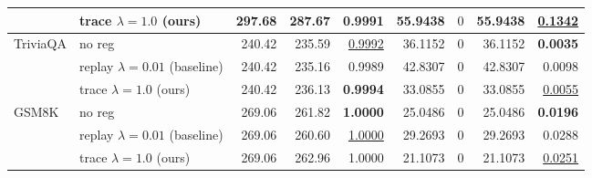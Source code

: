 \begin{table}[t]
{\begin{tabular}{l l rrrrrrr}
 & trace $\lambda{=}1.0$ (ours) & 297.68 & 287.67 & \textbf{0.9991} & 55.9438 & \cellcolor{cyan!12} $0$ & 55.9438 & \underline{0.1342} \\
\midrule
TriviaQA & no reg & 240.42 & 235.59 & \underline{0.9992} & 36.1152 & \cellcolor{cyan!12} $0$ & 36.1152 & \textbf{0.0035} \\
 & replay $\lambda{=}0.01$ (baseline) & 240.42 & 235.16 & 0.9989 & 42.8307 & \cellcolor{cyan!12} $0$ & 42.8307 & 0.0098 \\
 & trace $\lambda{=}1.0$ (ours) & 240.42 & 236.13 & \textbf{0.9994} & 33.0855 & \cellcolor{cyan!12} $0$ & 33.0855 & \underline{0.0055} \\
\midrule
GSM8K & no reg & 269.06 & 261.82 & \textbf{1.0000} & 25.0486 & \cellcolor{cyan!12} $0$ & 25.0486 & \textbf{0.0196} \\
 & replay $\lambda{=}0.01$ (baseline) & 269.06 & 260.60 & \underline{1.0000} & 29.2693 & \cellcolor{cyan!12} $0$ & 29.2693 & 0.0288 \\
 & trace $\lambda{=}1.0$ (ours) & 269.06 & 262.96 & 1.0000 & 21.1073 & \cellcolor{cyan!12} $0$ & 21.1073 & \underline{0.0251} \\
\bottomrule
\end{tabular}}
\end{table}